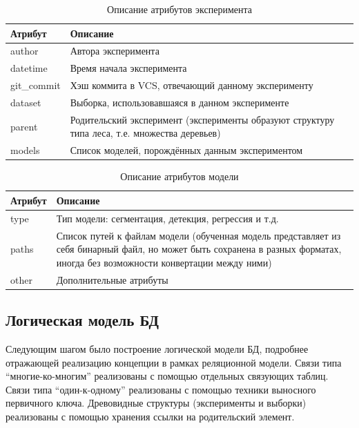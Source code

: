 \documentclass[a4paper]{article}
\begin{document}
\begin{table}[h]
	\begin{tabular}{|C{0.20\textwidth}|p{0.75\textwidth}|}
		\hline
		Атрибут & \centering\arraybackslash Описание \\
		\hline
		author & Автора эксперимента \\
		\hline
		datetime & Время начала эксперимента \\
		\hline
		git\_commit & Хэш коммита в VCS, отвечающий данному эксперименту \\
		\hline
		dataset & Выборка, использовавшаяся в данном эксперименте \\
		\hline
		parent & Родительский эксперимент (эксперименты образуют структуру типа леса, т.е. множества деревьев) \\
		\hline
		models & Список моделей, порождённых данным экспериментом \\
		\hline
	\end{tabular}
	\caption{Описание атрибутов эксперимента}
\end{table}


\begin{table}[h]
	\begin{tabular}{|C{0.20\textwidth}|p{0.75\textwidth}|}
		\hline
		Атрибут & \centering\arraybackslash Описание \\
		\hline
		type & Тип модели: сегментация, детекция, регрессия и т.д. \\
		\hline
		paths & Список путей к файлам модели (обученная модель представляет из себя бинарный файл, но может быть сохранена в разных форматах, иногда без возможности конвертации между ними) \\
		\hline
		other & Дополнительные атрибуты \\
		\hline
	\end{tabular}
	\caption{Описание атрибутов модели}
\end{table}

\subsection{Логическая модель БД}
Следующим шагом было построение логической модели БД, подробнее отражающей реализацию концепции в рамках реляционной модели.
Связи типа ``многие-ко-многим'' реализованы с помощью отдельных связующих таблиц.
Связи типа ``один-к-одному'' реализованы с помощью техники выносного первичного ключа.
Древовидные структуры (эксперименты и выборки) реализованы с помощью хранения ссылки на родительский элемент.
\end{document}
